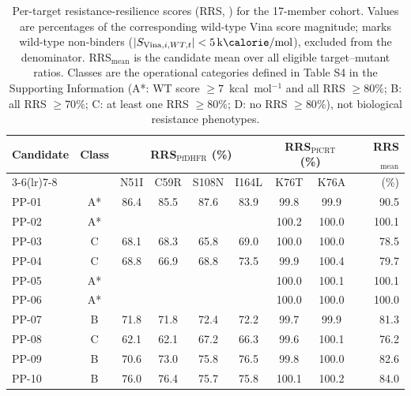 \documentclass[11pt,a4paper]{article}
\begin{document}
	\begin{table}[ht!]
		\centering
		\caption{Per-target resistance-resilience scores (RRS, ) for the 17-member cohort. Values are percentages of the corresponding wild-type Vina score magnitude; \textemdash{} marks wild-type non-binders ($|S_{\mathrm{Vina},i,WT,t}|<\qty{5}{\kilo\calorie\per\mol}$), excluded from the denominator. RRS$_{\mathrm{mean}}$ is the candidate mean over all eligible target--mutant ratios. Classes are the operational categories defined in Table S4 in the Supporting Information (A*: WT score $\geq 7$~kcal~mol$^{-1}$ and all RRS $\geq 80\%$; B: all RRS $\geq 70\%$; C: at least one RRS $\geq 80\%$; D: no RRS $\geq 80\%$), not biological resistance phenotypes.}
		\label{tab:rrs_main}
		\small
		\begin{tabular}{@{}lcccccccr@{}}
			\toprule
			Candidate & Class & \multicolumn{4}{c}{RRS$_{\mathrm{PfDHFR}}$ (\%)} & \multicolumn{2}{c}{RRS$_{\mathrm{PfCRT}}$ (\%)} & RRS$_{\mathrm{mean}}$ \\
			\cmidrule(lr){3-6}\cmidrule(lr){7-8}
			& & N51I & C59R & S108N & I164L & K76T & K76A & (\%) \\
			\midrule
			PP-01 & A* & \num{86.4} & \num{85.5} & \num{87.6} & \num{83.9} & \num{99.8} & \num{99.9} & \num{90.5} \\
			PP-02 & A* & \textemdash & \textemdash & \textemdash & \textemdash & \num{100.2} & \num{100.0} & \num{100.1} \\
			PP-03 & C & \num{68.1} & \num{68.3} & \num{65.8} & \num{69.0} & \num{100.0} & \num{100.0} & \num{78.5} \\
			PP-04 & C & \num{68.8} & \num{66.9} & \num{68.8} & \num{73.5} & \num{99.9} & \num{100.4} & \num{79.7} \\
			PP-05 & A* & \textemdash & \textemdash & \textemdash & \textemdash & \num{100.0} & \num{100.1} & \num{100.1} \\
			PP-06 & A* & \textemdash & \textemdash & \textemdash & \textemdash & \num{100.0} & \num{100.0} & \num{100.0} \\
			PP-07 & B & \num{71.8} & \num{71.8} & \num{72.4} & \num{72.2} & \num{99.7} & \num{99.9} & \num{81.3} \\
			PP-08 & C & \num{62.1} & \num{62.1} & \num{67.2} & \num{66.3} & \num{99.6} & \num{100.1} & \num{76.2} \\
			PP-09 & B & \num{70.6} & \num{73.0} & \num{75.8} & \num{76.5} & \num{99.8} & \num{100.0} & \num{82.6} \\
			PP-10 & B & \num{76.0} & \num{76.4} & \num{75.7} & \num{75.8} & \num{100.1} & \num{100.2} & \num{84.0} \\

\end{tabular}
\end{table}
\end{document}
